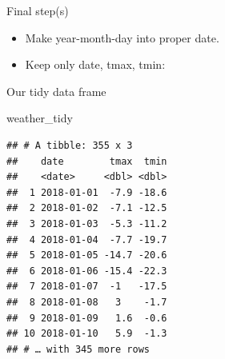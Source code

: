 \documentclass[ignorenonframetext,]{beamer}
\newenvironment{Shaded}{\begin{snugshade}}{\end{snugshade}}
\newcommand{\DataTypeTok}[1]{\textcolor[rgb]{0.13,0.29,0.53}{#1}}
\newcommand{\KeywordTok}[1]{\textcolor[rgb]{0.13,0.29,0.53}{\textbf{#1}}}
\newcommand{\NormalTok}[1]{#1}
\newcommand{\OperatorTok}[1]{\textcolor[rgb]{0.81,0.36,0.00}{\textbf{#1}}}
\newcommand{\StringTok}[1]{\textcolor[rgb]{0.31,0.60,0.02}{#1}}
\providecommand{\tightlist}{%
  \setlength{\itemsep}{0pt}\setlength{\parskip}{0pt}}
\begin{document}
\begin{frame}[fragile]{Final step(s)}
\protect\hypertarget{final-steps}{}

\begin{itemize}
\tightlist
\item
  Make year-month-day into proper date.
\item
  Keep only date, tmax, tmin: \small
\end{itemize}

\begin{Shaded}
\end{Shaded}

\normalsize

\end{frame}

\begin{frame}[fragile]{Our tidy data frame}
\protect\hypertarget{our-tidy-data-frame}{}

\begin{Shaded}
\begin{Highlighting}[]
\NormalTok{weather_tidy}
\end{Highlighting}
\end{Shaded}

\begin{verbatim}
## # A tibble: 355 x 3
##    date        tmax  tmin
##    <date>     <dbl> <dbl>
##  1 2018-01-01  -7.9 -18.6
##  2 2018-01-02  -7.1 -12.5
##  3 2018-01-03  -5.3 -11.2
##  4 2018-01-04  -7.7 -19.7
##  5 2018-01-05 -14.7 -20.6
##  6 2018-01-06 -15.4 -22.3
##  7 2018-01-07  -1   -17.5
##  8 2018-01-08   3    -1.7
##  9 2018-01-09   1.6  -0.6
## 10 2018-01-10   5.9  -1.3
## # … with 345 more rows
\end{verbatim}

\end{frame}
\end{document}
